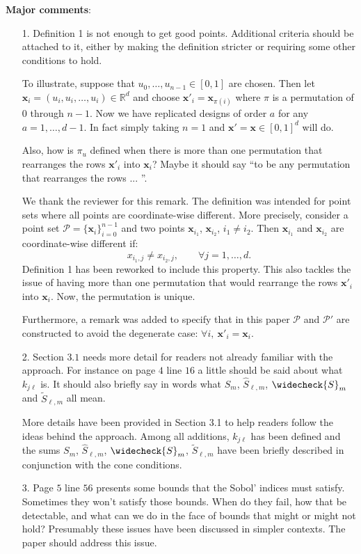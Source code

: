 \documentclass[10pt,a4paper]{article}
\newcommand{\vect}[1]{\boldsymbol{\mathbf{#1}}}
\newcommand{\vx}{\vect{x}}
\newcommand{\hS}{\widehat{S}}
\newcommand{\tS}{\widetilde{S}}
\newcommand{\wcS}{\widecheck{S}}
\newcommand{\answer}[1]{{\color{blue} #1 }}
\begin{document}
\textbf{Major comments}:
\begin{itemize}
\item[1.] Definition 1 is not enough to get good points. Additional criteria should be attached to it, either by making the definition stricter or requiring some
other conditions to hold.

To illustrate, suppose that $u_0,\dots,u_{n-1} \in [0,1]$ are chosen. Then let $\vx_i = (u_i, u_i, \dots,u_i) \in \mathbb{R}^d$ and choose $\vx'_i= \vx_{\pi(i)}$ where $\pi$ is a permutation
of $0$ through $n-1$. Now we have replicated designs of order $a$ for any $a = 1,\dots,d-1$. In fact simply taking $n = 1$ and $\vx'=\vx \in [0,1]^d$ will do.

Also, how is $\pi_u$ defined when there is more than one permutation that rearranges the rows $\vx'_i$ into $\vx_i$? Maybe it should say ``to be any permutation
that rearranges the rows ... ''.

{\color{blue} We thank the reviewer for this remark. The definition was intended for point sets where all points are coordinate-wise different. More precisely, consider a point set $\mathcal{P}=\{\vx_i\}_{i=0}^{n-1}$ and two points $\vx_{i_1}$, $\vx_{i_2}$, $i_1 \neq i_2$. Then $\vx_{i_1}$ and $\vx_{i_2}$ are coordinate-wise different if: 
$$ x_{i_1,j} \neq x_{i_2,j}, \qquad \forall j=1,\dots,d .$$
Definition 1 has been reworked to include this property. This also tackles the issue of having more than one permutation that would rearrange the rows $\vx'_i$ into $\vx_i$. Now, the permutation is unique.

Furthermore, a remark was added to specify that in this paper $\mathcal{P}$ and $\mathcal{P}'$ are constructed to avoid the degenerate case: $\forall i, \ \vx'_i=\vx_i$.}



\item[2.] Section $3.1$ needs more detail for readers not already familiar with the approach. For instance on page $4$ line $16$ a little should be said about what $k_{j\ell}$ is. It should also briefly say in words what $S_m$, $\hS_{\ell,m}$, $\wcS_m$ and $\tS_{\ell,m}$ all mean.

\answer{More details have been provided in Section 3.1 to help readers follow the ideas behind the approach. Among all additions, $k_{j\ell}$ has been defined and the sums $S_m$, $\hS_{\ell,m}$, $\wcS_m$, $\tS_{\ell,m}$ have been briefly described in conjunction with the cone conditions.}

\item[3.] Page $5$ line $56$ presents some bounds that the Sobol' indices must satisfy. Sometimes they won't satisfy those bounds. When do they fail, how that
be detectable, and what can we do in the face of bounds that might or might not hold? Presumably these issues have been discussed in simpler contexts. The paper should address this issue.


\end{itemize}
\end{document}
